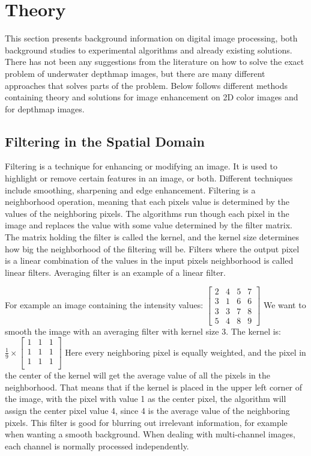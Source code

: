 \section{Theory}\label{overview}
This section presents background information on digital image processing, both background studies to experimental algorithms and already existing solutions. There has not been any suggestions from the literature on how to solve the exact problem of underwater depthmap images, but there are many different approaches that solves parts of the problem.
Below follows different methods containing theory and solutions for image enhancement on 2D color images and for depthmap images.


\subsection{Filtering in the Spatial Domain}

Filtering is a technique for enhancing or modifying an image. It is used to highlight or remove certain features in an image, or both. Different techniques include smoothing, sharpening and edge enhancement. 
Filtering is a neighborhood operation, meaning that each pixels value is determined by the values of the neighboring pixels. The algorithms run though each pixel in the image and replaces the value with some value determined by the filter matrix. The matrix holding the filter is called the kernel, and the kernel size determines how big the neighborhood of the filtering will be. Filters where the output pixel is a linear combination of the values in the input pixels neighborhood is called linear filters. Averaging filter is an example of a linear filter.

For example an image containing the intensity values: 
$\begin{bmatrix}
    2 & 4 & 5 & 7 \\
    3 & 1 & 6 & 6 \\
    3 & 3 & 7 & 8 \\
    5 & 4 & 8 & 9 
\end{bmatrix}$
We want to smooth the image with an averaging filter with kernel size 3. The kernel is: 
$\frac{1}{9} \times 
\begin{bmatrix}
    1 & 1 & 1 \\
    1 & 1 & 1 \\
    1 & 1 & 1 \\
\end{bmatrix}$
Here every neighboring pixel is equally weighted, and the pixel in the center of the kernel will get the average value of all the pixels in the neighborhood. That means that if the kernel is placed in the upper left corner of the image, with the pixel with value 1 as the center pixel, the algorithm will assign the center pixel value 4, since 4 is the average value of the neighboring pixels.
This filter is good for blurring out irrelevant information, for example when wanting a smooth background.
When dealing with multi-channel images, each channel is normally processed independently.

